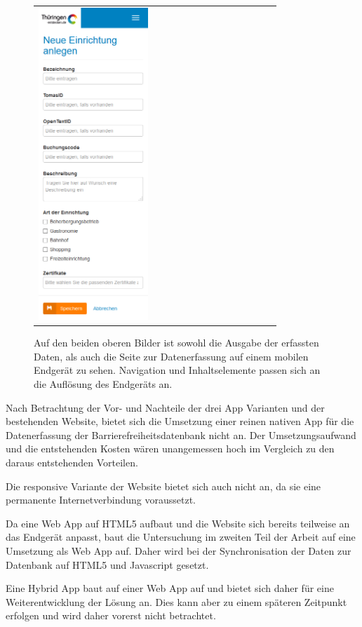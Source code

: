 \begin{figure}[htb]
\begin{tabular}{l r}
		\includegraphics[width=0.49\textwidth]{Bilder/Datenerfassung-mobil}
	\end{tabular}
	\caption{Auf den beiden oberen Bilder ist sowohl die Ausgabe der erfassten Daten, als auch die Seite zur Datenerfassung auf einem mobilen Endgerät zu sehen. Navigation und Inhaltselemente passen sich an die Auflösung des Endgeräts an.}
	\label{Websitemobil}
\end{figure}

\cleardoublepage

Nach Betrachtung der Vor- und Nachteile der drei App Varianten und der bestehenden Website, bietet sich die Umsetzung einer reinen nativen App für die Datenerfassung der Barrierefreiheitsdatenbank nicht an. Der Umsetzungsaufwand und die entstehenden Kosten wären unangemessen hoch im Vergleich zu den daraus entstehenden Vorteilen.

Die responsive Variante der Website bietet sich auch nicht an, da sie eine permanente Internetverbindung voraussetzt.

Da eine Web App auf \ac{HTML5} aufbaut und die Website sich bereits teilweise an das Endgerät anpasst, baut die Untersuchung im zweiten Teil der Arbeit auf eine Umsetzung als Web App auf. Daher wird bei der Synchronisation der Daten zur Datenbank auf \ac{HTML5} und Javascript gesetzt.

Eine Hybrid App baut auf einer Web App auf und bietet sich daher für eine Weiterentwicklung der Lösung an. Dies kann aber zu einem späteren Zeitpunkt erfolgen und wird daher vorerst nicht betrachtet.
